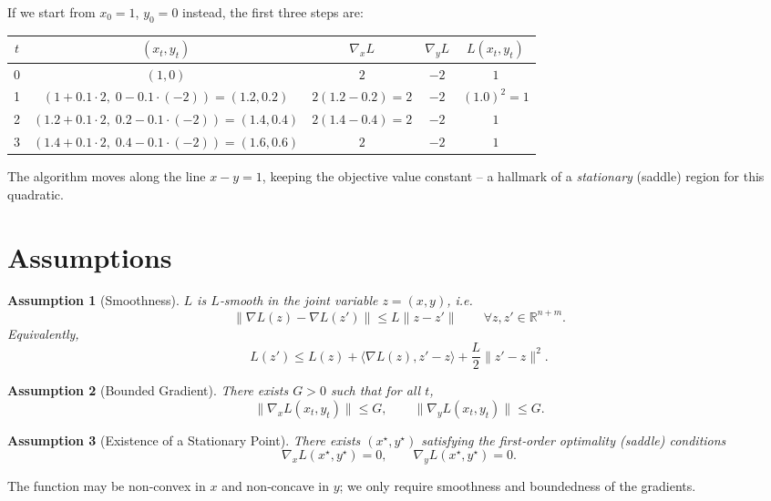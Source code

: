 \documentclass[11pt]{article}
\newtheorem{assumption}{Assumption}[section]
\begin{document}
If we start from $x_0=1$, $y_0=0$ instead, the first three steps are:

\begin{center}
\begin{tabular}{c|c|c|c|c}
$t$ & $(x_t,y_t)$ & $\nabla_x L$ & $\nabla_y L$ & $L(x_t,y_t)$\\ \hline
0 & $(1,0)$ & $2$ & $-2$ & $1$\\
1 & $(1+0.1\cdot2,\;0-0.1\cdot(-2))=(1.2,0.2)$ & $2(1.2-0.2)=2$ & $-2$ & $(1.0)^2=1$\\
2 & $(1.2+0.1\cdot2,\;0.2-0.1\cdot(-2))=(1.4,0.4)$ & $2(1.4-0.4)=2$ & $-2$ & $1$\\
3 & $(1.4+0.1\cdot2,\;0.4-0.1\cdot(-2))=(1.6,0.6)$ & $2$ & $-2$ & $1$
\end{tabular}
\end{center}
The algorithm moves along the line $x-y=1$, keeping the objective value constant – a hallmark of a \emph{stationary} (saddle) region for this quadratic.

\newpage
\section{Assumptions}
\begin{assumption}[Smoothness]\label{ass:smooth}
$L$ is $L$‑smooth in the joint variable $z=(x,y)$, i.e.
\[
\|\nabla L(z)-\nabla L(z')\| \le L\|z-z'\|\qquad\forall z,z'\in\mathbb{R}^{n+m}.
\tag{3}
\]
Equivalently,
\[
L(z')\le L(z)+\langle \nabla L(z),z'-z\rangle +\frac{L}{2}\|z'-z\|^{2}.
\tag{4}
\]
\end{assumption}

\begin{assumption}[Bounded Gradient]\label{ass:bounded}
There exists $G>0$ such that for all $t$,
\[
\| \nabla_{x}L(x_t,y_t)\| \le G,\qquad 
\| \nabla_{y}L(x_t,y_t)\| \le G.
\tag{5}
\]
\end{assumption}

\begin{assumption}[Existence of a Stationary Point]\label{ass:stationary}
There exists $(x^{\star},y^{\star})$ satisfying the first‑order optimality (saddle) conditions
\[
\nabla_{x}L(x^{\star},y^{\star})=0,\qquad 
\nabla_{y}L(x^{\star},y^{\star})=0.
\tag{6}
\]
\end{assumption}

The function may be non‑convex in $x$ and non‑concave in $y$; we only require smoothness and boundedness of the gradients.
\end{document}
